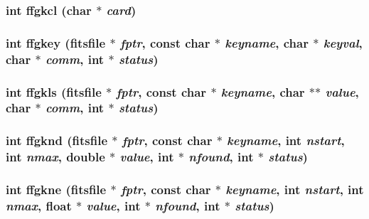 \subsubsection{\setlength{\rightskip}{0pt plus 5cm}int ffgkcl (char $\ast$ {\em card})}\label{fitsio_8h_89eaf0da53af08c1e07b6940a3ebdf32}


\subsubsection{\setlength{\rightskip}{0pt plus 5cm}int ffgkey (\bf{fitsfile} $\ast$ {\em fptr}, const char $\ast$ {\em keyname}, char $\ast$ {\em keyval}, char $\ast$ {\em comm}, int $\ast$ {\em status})}\label{fitsio_8h_9a92da40129953d96be3d75a06ee8b8a}


\subsubsection{\setlength{\rightskip}{0pt plus 5cm}int ffgkls (\bf{fitsfile} $\ast$ {\em fptr}, const char $\ast$ {\em keyname}, char $\ast$$\ast$ {\em value}, char $\ast$ {\em comm}, int $\ast$ {\em status})}\label{fitsio_8h_ffb87d66b7458265f69a1989575b4c0c}


\subsubsection{\setlength{\rightskip}{0pt plus 5cm}int ffgknd (\bf{fitsfile} $\ast$ {\em fptr}, const char $\ast$ {\em keyname}, int {\em nstart}, int {\em nmax}, double $\ast$ {\em value}, int $\ast$ {\em nfound}, int $\ast$ {\em status})}\label{fitsio_8h_bd018a9bcb045ffaedb09fd79c311736}


\subsubsection{\setlength{\rightskip}{0pt plus 5cm}int ffgkne (\bf{fitsfile} $\ast$ {\em fptr}, const char $\ast$ {\em keyname}, int {\em nstart}, int {\em nmax}, float $\ast$ {\em value}, int $\ast$ {\em nfound}, int $\ast$ {\em status})}\label{fitsio_8h_72336d055c54ad79acde9bbdf96cf8d7}


